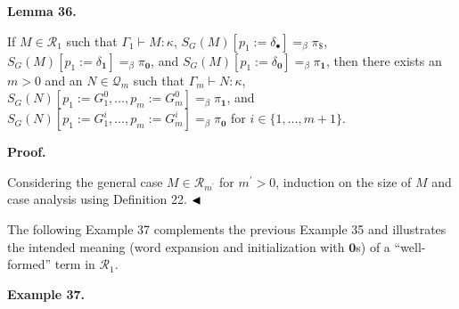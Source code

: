  
 
\par\medskip\noindent\textbf{Lemma 36.}\par
 
 
If $M\in\mathcal{R}_{1}$ such that $\Gamma_{1}\vdash M:\kappa$, $S_{G}(M)[p_{1}:=\delta_{\bullet}]=_{\beta}\pi_{\$}$, $S_{G}(M)[p_{1}:=\delta_{\mathbf{1}}]=_{\beta}\pi_{\mathbf{0}}$, and $S_{G}(M)[p_{1}:=\delta_{\mathbf{0}}]=_{\beta}\pi_{\mathbf{1}}$, then there exists an $m>0$ and an $N\in\mathcal{Q}_{m}$ such that $\Gamma_{m}\vdash N:\kappa$, $S_{G}(N)[p_{1}:=G_{1}^{0},\ldots,p_{m}:=G_{m}^{0}]=_{\beta}\pi_{\mathbf{1}}$, and $S_{G}(N)[p_{1}:=G_{1}^{i},\ldots,p_{m}:=G_{m}^{i}]=_{\beta}\pi_{\mathbf{0}}$ for $i\in\{1,\ldots,m+1\}$.\par
 
 
 
 
 
\par\medskip\noindent\textbf{Proof.}\par
 
 
Considering the general case $M\in\mathcal{R}_{m^{\prime}}$ for $m^{\prime}>0$, induction on the size of $M$ and case analysis using Definition 22. $\hfill\blacktriangleleft$\par
 
 
 
The following Example 37 complements the previous Example 35 and illustrates the intended meaning (word expansion and initialization with $\mathbf{0}$s) of a “well-formed” term in $\mathcal{R}_{1}$.\par
 
 
 
\par\medskip\noindent\textbf{Example 37.}\par
 
 
